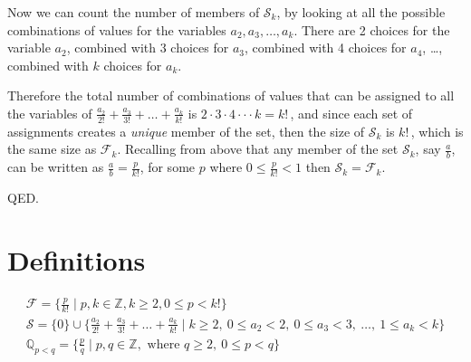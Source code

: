 \documentclass{article}
\begin{document}
Now we can count the number of members of \(\mathcal{S}_k\), by looking at all the
possible combinations of values for the variables \(a_2, a_3, \dots{}, a_k\).
There are 2 choices for the variable \(a_2\),
combined with 3 choices for \(a_3\),
combined with 4 choices for \(a_4\),
\dots{},
combined with \(k\) choices for \(a_k\).

Therefore the total number of combinations of values
that can be assigned to all the variables of \(\frac{a_2}{2!} + \frac{a_3}{3!} + \dots{} + \frac{a_k}{k!}\)
is \(2\cdot{}3\cdot{}4\cdot\cdot{}\cdot{}k = k!\,\), and since each set of assignments 
creates a \emph{unique} member of the set, then the size of \(\mathcal{S}_k\) is \(k!\,\), which
is the same size as \(\mathcal{F}_k\).
Recalling from above that any 
member of the set \(\mathcal{S}_k\), say \(\frac{a}{b}\),
can be written as \(\frac{a}{b} = \frac{p}{k!}\), for some \(p\) where 
\(0\le{}\frac{p}{k!}<1\) then
\(\mathcal{S}_k = \mathcal{F}_k\).

QED.

% 
% 
% 
%
% 

\section*{Definitions}

\begin{gather*}
\mathcal{F}
= \{\frac{p}{k!} \mid
p,k \in \mathbb{Z}, k \ge{} 2, 0 \le{} p < k!\}\\
\mathcal{S} = \{0\} \cup \{\frac{a_2}{2!} + \frac{a_3}{3!} + \dots{} + \frac{a_k}{k!} \mid
k\!\ge{}\!2,\ 
0\!\le{}\!a_2\!<\!2,\ 
0\!\le{}\!a_3\!<\!3,\ 
\dots{},\ 
1\!\le{}\!a_k\!<\!k\}\\
\mathbb{Q}_{p<q} = \{\frac{p}{q} \mid p, q \in \mathbb{Z},\text{ where } q \ge{} 2,\ 0 \le{} p < q\}
\end{gather*}
\end{document}

